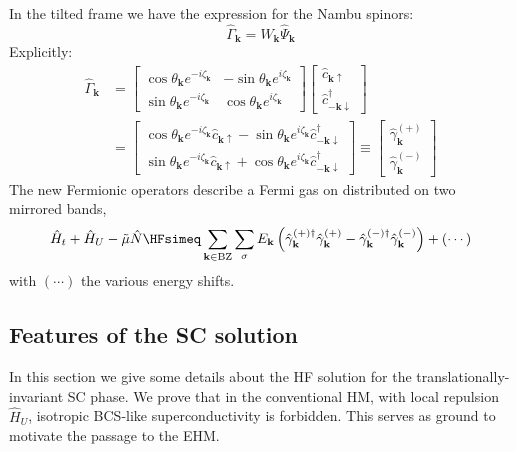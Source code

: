In the tilted frame we have the expression for the Nambu spinors:
\begin{equation}\label{eq:sc-Gamma=WPsi}
	\hat\Gamma_\mathbf{k} = W_\mathbf{k} \hat \Psi_\mathbf{k}
\end{equation}
Explicitly:
\begin{align}
	\hat\Gamma_\mathbf{k} &= \begin{bmatrix}
		\cos \theta_\mathbf{k} e^{-i\zeta_\mathbf{k}} & - \sin \theta_\mathbf{k} e^{i\zeta_\mathbf{k}} \\
		\sin \theta_\mathbf{k} e^{-i\zeta_\mathbf{k}} & \cos \theta_\mathbf{k} e^{i\zeta_\mathbf{k}}
	\end{bmatrix} \begin{bmatrix}
		\hat c_{\mathbf{k}\uparrow} \\
		\hat c_{-\mathbf{k}\downarrow}^\dagger 
	\end{bmatrix} \nonumber \\
	&= \begin{bmatrix}
		\cos \theta_\mathbf{k} e^{-i\zeta_\mathbf{k}} \hat c_{\mathbf{k}\uparrow} - \sin \theta_\mathbf{k} e^{i\zeta_\mathbf{k}} \hat c_{-\mathbf{k}\downarrow}^\dagger  \\
		\sin \theta_\mathbf{k} e^{-i\zeta_\mathbf{k}} \hat c_{\mathbf{k}\uparrow} + \cos \theta_\mathbf{k} e^{i\zeta_\mathbf{k}} \hat c_{-\mathbf{k}\downarrow}^\dagger
	\end{bmatrix} \equiv
	\begin{bmatrix}
		\hat \gamma_\mathbf{k}^{(+)} \\
		\hat \gamma_\mathbf{k}^{(-)} 
	\end{bmatrix} \label{eq:sc-Gamma=WPsi-explicit}
\end{align}
The new Fermionic operators describe a Fermi gas on distributed on two mirrored bands,
\[
	\hat H_t + \hat H_U - \tilde{\mu} \hat N \HFsimeq \sum_{\mathbf{k} \in \mathrm{BZ}} \sum_\sigma E_\mathbf{k} \left(
	\hat \gamma_\mathbf{k}^{(+)\dagger} \hat \gamma_\mathbf{k}^{(+)} - \hat \gamma_\mathbf{k}^{(-)\dagger} \hat \gamma_\mathbf{k}^{(-)}
	\right) + (\cdots) 
\]
with $(\cdots)$ the various energy shifts.

\subsection{Features of the SC solution}\label{subsec:sc-features}

In this section we give some details about the HF solution for the translationally-invariant SC phase. We prove that in the conventional HM, with local repulsion $\hat H_U$, isotropic BCS-like superconductivity is forbidden. This serves as ground to motivate the passage to the EHM.

